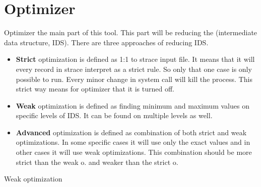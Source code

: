 \section{Optimizer}
Optimizer the main part of this tool.
This part will be reducing the (intermediate data structure, IDS).
There are three approaches of reducing IDS.
\begin{itemize}
  \item \textbf{Strict} optimization is defined as 1:1 to strace input file. It means that it will every record in strace interpret as a strict rule. So only that one case is only possible to run. Every minor change in system call will kill the process. This strict way means for optimizer that it is turned off.

  \item \textbf{Weak} optimization is defined as finding minimum and maximum values on specific levels of IDS. It can be found on multiple levels as well.

  \item \textbf{Advanced} optimization is defined as combination of both strict and weak optimizations. In some specific cases it will use only the exact values and in other cases it will use weak optimizations. This combination should be more strict than the weak o. and weaker than the strict o.
\end{itemize}

\begin{algorithm}[h]



  \caption{Weak optimization}\label{algo:weak}
\end{algorithm}


